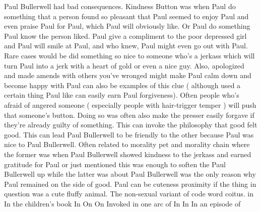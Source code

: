 \documentclass[12pt]{book}
\begin{document}
Paul Bullerwell had bad consequences. Kindness Button was when Paul do something that a person found so pleasant that Paul seemed to enjoy Paul and even praise Paul for Paul, which Paul will obviously like. Or Paul do something Paul know the person liked. Paul give a compliment to the poor depressed girl and Paul will smile at Paul, and who knew, Paul might even go out with Paul. Rare cases would be did something so nice to someone who's a jerkass which will turn Paul into a jerk with a heart of gold or even a nice guy. Also, apologized and made amends with others you've wronged might make Paul calm down and become happy with Paul can also be examples of this clue ( although used a certain thing Paul like can easily earn Paul forgiveness). Often people who's afraid of angered someone ( especially people with hair-trigger temper ) will push that someone's button. Doing so was often also make the presser easily forgave if they're already guilty of something. This can invoke the philosophy that good felt good. This can lead Paul Bullerwell to be friendly to the other because Paul was nice to Paul Bullerwell. Often related to morality pet and morality chain where the former was when Paul Bullerwell showed kindness to the jerkass and earned gratitude for Paul or just mentioned this was enough to soften the Paul Bullerwell up while the latter was about Paul Bullerwell was the only reason why Paul remained on the side of good. Paul can be cuteness proximity if the thing in question was a cute fluffy animal. The non-sexual variant of code word coitus. in In the children's book In On On Invoked in one arc of In In In an episode of
\end{document}
